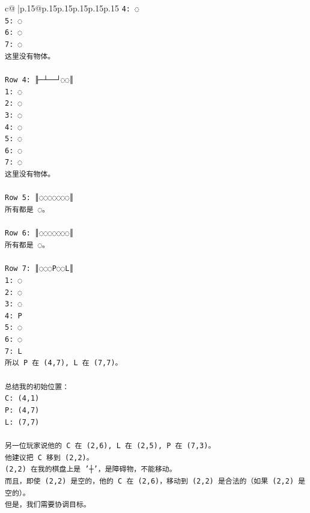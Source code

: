 \documentclass{article}
\begin{document}
{\begin{supertabular}{c@{$\;$}|p{.15\linewidth}@{}p{.15\linewidth}p{.15\linewidth}p{.15\linewidth}p{.15\linewidth}p{.15\linewidth}}
{{{\texttt{4: ◌} \\
\texttt{5: ◌} \\
\texttt{6: ◌} \\
\texttt{7: ◌} \\
\texttt{这里没有物体。} \\
\\ 
\texttt{Row 4: ╟─┴──┘◌◌║} \\
\texttt{1: ◌} \\
\texttt{2: ◌} \\
\texttt{3: ◌} \\
\texttt{4: ◌} \\
\texttt{5: ◌} \\
\texttt{6: ◌} \\
\texttt{7: ◌} \\
\texttt{这里没有物体。} \\
\\ 
\texttt{Row 5: ║◌◌◌◌◌◌◌║} \\
\texttt{所有都是 ◌。} \\
\\ 
\texttt{Row 6: ║◌◌◌◌◌◌◌║} \\
\texttt{所有都是 ◌。} \\
\\ 
\texttt{Row 7: ║◌◌◌P◌◌L║} \\
\texttt{1: ◌} \\
\texttt{2: ◌} \\
\texttt{3: ◌} \\
\texttt{4: P} \\
\texttt{5: ◌} \\
\texttt{6: ◌} \\
\texttt{7: L} \\
\texttt{所以 P 在 (4,7), L 在 (7,7)。} \\
\\ 
\texttt{总结我的初始位置：} \\
\texttt{C: (4,1)} \\
\texttt{P: (4,7)} \\
\texttt{L: (7,7)} \\
\\ 
\texttt{另一位玩家说他的 C 在 (2,6), L 在 (2,5), P 在 (7,3)。} \\
\texttt{他建议把 C 移到 (2,2)。} \\
\texttt{(2,2) 在我的棋盘上是 '┼'，是障碍物，不能移动。} \\
\texttt{而且，即使 (2,2) 是空的，他的 C 在 (2,6)，移动到 (2,2) 是合法的（如果 (2,2) 是空的）。} \\
\texttt{但是，我们需要协调目标。} \\
}}}
\end{supertabular}}
\end{document}
